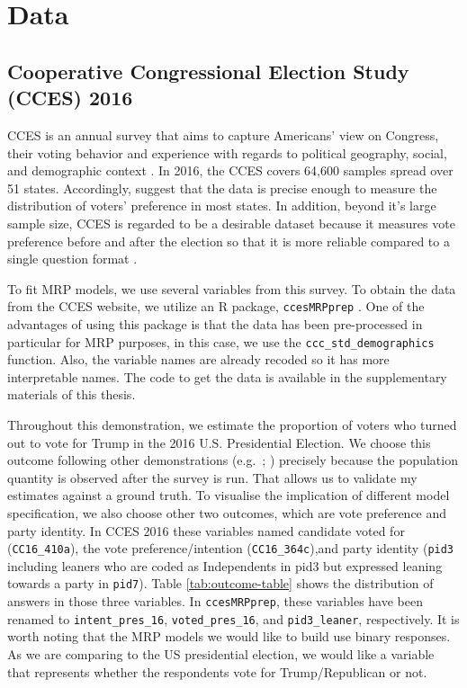 \documentclass{monashthesis}
\begin{document}
\hypertarget{data}{%
\section{Data}\label{data}}

\hypertarget{cooperative-congressional-election-study-cces-2016}{%
\subsection{Cooperative Congressional Election Study (CCES) 2016}\label{cooperative-congressional-election-study-cces-2016}}

CCES is an annual survey that aims to capture Americans' view on Congress, their voting behavior and experience with regards to political geography, social, and demographic context \autocite{cces_data}. In 2016, the CCES covers 64,600 samples spread over 51 states. Accordingly, \textcite{cces_data} suggest that the data is precise enough to measure the distribution of voters' preference in most states. In addition, beyond it's large sample size, CCES is regarded to be a desirable dataset because it measures vote preference before and after the election so that it is more reliable compared to a single question format \autocite{kuriwaki}.

To fit MRP models, we use several variables from this survey. To obtain the data from the CCES website, we utilize an R package, \texttt{ccesMRPprep} \autocite{ccesmrpprep}. One of the advantages of using this package is that the data has been pre-processed in particular for MRP purposes, in this case, we use the \texttt{ccc\_std\_demographics} function. Also, the variable names are already recoded so it has more interpretable names. The code to get the data is available in the supplementary materials of this thesis.

Throughout this demonstration, we estimate the proportion of voters who turned out to vote for Trump in the 2016 U.S. Presidential Election. We choose this outcome following other demonstrations (e.g.~\textcite{kuriwaki}; \textcite{MengXiao-Li2018Spap}) precisely because the population quantity is observed after the survey is run. That allows us to validate my estimates against a ground truth. To visualise the implication of different model specification, we also choose other two outcomes, which are vote preference and party identity. In CCES 2016 these variables named candidate voted for (\texttt{CC16\_410a}), the vote preference/intention (\texttt{CC16\_364c}),and party identity (\texttt{pid3} including leaners who are coded as Independents in pid3 but expressed leaning towards a party in \texttt{pid7}). Table \ref{tab:outcome-table} shows the distribution of answers in those three variables. In \texttt{ccesMRPprep}, these variables have been renamed to \texttt{intent\_pres\_16}, \texttt{voted\_pres\_16}, and \texttt{pid3\_leaner}, respectively. It is worth noting that the MRP models we would like to build use binary responses. As we are comparing to the US presidential election, we would like a variable that represents whether the respondents vote for Trump/Republican or not.
\end{document}
